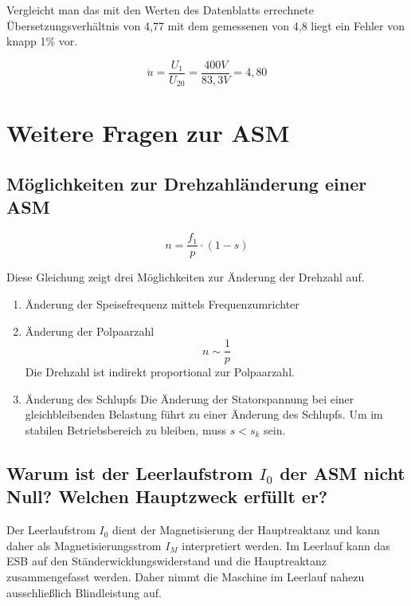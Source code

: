 \documentclass[conference]{IEEEtran}
\begin{document}
Vergleicht man das mit den Werten des Datenblatts errechnete
Übersetzungsverhältnis von 4,77 mit dem gemessenen von 4,8 liegt ein Fehler
von knapp 1\%  vor.

\begin{equation}
    \ddot{u} = \frac{ U_{1} }{ U_{20} } = \frac{ 400V }{ 83,3V } = 4,80
\end{equation}

\newpage
\section{Weitere Fragen zur ASM}
\subsection{Möglichkeiten zur Drehzahländerung einer ASM}

\begin{equation}
    n = \frac{f_{1}}{p} \cdot (1-s)
\end{equation}

Diese Gleichung zeigt drei Möglichkeiten zur Änderung der Drehzahl auf.

\begin{enumerate}
    \item Änderung der Speisefrequenz mittels Frequenzumrichter
    \item Änderung der Polpaarzahl
          \begin{equation}
              n \sim \frac{1}{p}
          \end{equation}
          Die Drehzahl ist indirekt proportional zur Polpaarzahl.
    \item Änderung des Schlupfs
          Die Änderung der Statorspannung bei einer gleichbleibenden Belastung
          führt zu einer Änderung des Schlupfs. Um im stabilen Betriebsbereich
          zu bleiben, muss $s<s_{k}$ sein.
\end{enumerate}

\subsection{Warum ist der Leerlaufstrom $I_{0}$ der ASM nicht Null? Welchen
    Hauptzweck erfüllt er?}

Der Leerlaufstrom $I_{0}$ dient der Magnetisierung der Hauptreaktanz und kann
daher als Magnetisierungsstrom $I_{M}$ interpretiert werden. Im Leerlauf kann
das ESB auf den Ständerwicklungswiderstand und die Hauptreaktanz
zusammengefasst werden. Daher nimmt die Maschine im Leerlauf nahezu
ausschließlich Blindleistung auf.
\end{document}
